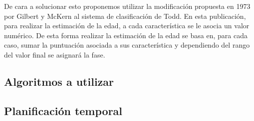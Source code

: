 De cara a solucionar esto proponemos utilizar la modificación propuesta en 1973 por Gilbert y McKern \cite{propuestaGilbert} al sistema de clasificación de Todd. En esta publicación, para realizar la estimación de la edad, a cada característica se le asocia un valor numérico. De esta forma realizar la estimación de la edad se basa en, para cada caso, sumar la puntuación asociada a sus característica y dependiendo del rango del valor final se asignará la fase.

\subsection{Algoritmos a utilizar}

\subsection{Planificación temporal}
